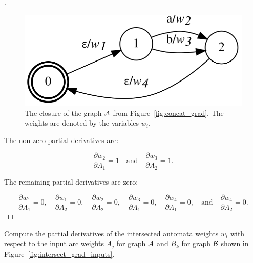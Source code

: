 \begin{proof}[\unskip\nopunct]

\begin{figure}
    \centering
    \includegraphics[scale=\dotscale]{figures/closure_grad}
    \caption{The closure of the graph $\mathcal{A}$ from Figure~\ref{fig:concat_grad}.
    The weights are denoted by the variables $w_i$.}
    \label{fig:closure_grad}
\end{figure}

The non-zero partial derivatives are:

$$
\frac{\partial w_2}{\partial A_1} = 1
    \quad \textrm{and} \quad \frac{\partial w_3}{\partial A_2} = 1.
$$

The remaining partial derivatives are zero:

$$
\frac{\partial w_1}{\partial A_1} = 0, \quad \frac{\partial w_1}{\partial A_2} = 0,
    \quad \frac{\partial w_2}{\partial A_2} = 0,
    \quad \frac{\partial w_3}{\partial A_1} = 0,
    \quad \frac{\partial w_4}{\partial A_1} = 0,
    \quad \textrm{and} \quad \frac{\partial w_4}{\partial A_2} = 0.
$$
\end{proof}

\begin{example}
Compute the partial derivatives of the intersected automata weights $w_i$ with
respect to the input arc weights $A_j$ for graph $\mathcal{A}$ and $B_k$ for graph
$\mathcal{B}$ shown in Figure~\ref{fig:intersect_grad_inputs}.
\end{example}

